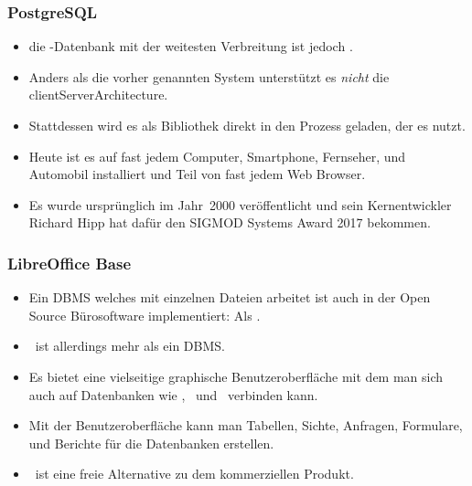 \documentclass[aspectratio=169,mathserif,notheorems]{beamer}%
\begin{document}
\begin{frame}[t]%
\frametitle{PostgreSQL}%
\begin{itemize}%
\item die -Datenbank mit der weitesten Verbreitung ist jedoch \sqlite\cite{WB2019RHSOOS,GPBHKP2022SPPAF,C20245YOQ,HWACIS:HO2023WKUOS}.%
\item<2-> Anders als die vorher genannten System unterstützt es \emph{nicht} die \gls{clientServerArchitecture}.%
\item<3-> Stattdessen wird es als Bibliothek direkt in den Prozess geladen, der es nutzt.%
\item<4-> Heute ist es auf fast jedem Computer, Smartphone, Fernseher, und Automobil installiert und Teil von fast jedem Web Browser.%
\item<5-> Es wurde ursprünglich im Jahr~2000 veröffentlicht und sein Kernentwickler Richard Hipp hat dafür den SIGMOD Systems Award 2017 bekommen\cite{C20245YOQ}.%
\end{itemize}%
%
%
\end{frame}%
%
\begin{frame}[t]%
\frametitle{LibreOffice Base}%
\begin{itemize}%
\item Ein DBMS welches mit einzelnen Dateien arbeitet ist auch in der Open Source Bürosoftware \libreoffice\cite{DF2024LTDF,GL2012LTSOOSSCBAFACSOL,S2022L7PFEUU} implementiert: Als \libreofficeBase\cite{FNFHWSKLSSGLFRSRPLJG2022BG7R1BOL7C,S2022L7PFEUU}.%
\item<2-> \libreofficeBase\ ist allerdings mehr als ein DBMS.%
\item<3-> Es bietet eine vielseitige graphische Benutzeroberfläche mit dem man sich auch auf Datenbanken wie \mysql, \mariadb\ und \postgresql\ verbinden kann.%
\item<4-> Mit der Benutzeroberfläche kann man Tabellen, Sichte, Anfragen, Formulare, und Berichte für die Datenbanken erstellen.%
\item<5-> \libreofficeBase\ ist eine freie Alternative zu dem kommerziellen Produkt\microsoftAccess\cite{SSI2023MA2BTA,B2020HOMA2,UC2021AFD}.%
\end{itemize}%
%
%
\end{frame}%
%
\end{document}
